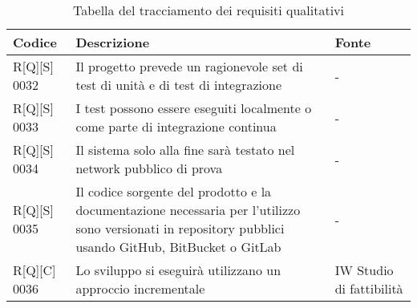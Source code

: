 \begin{center}
    \begin{longtable}{|p{2cm}|p{9cm}|p{2cm}|}%
    \caption{Tabella del tracciamento dei requisiti qualitativi}
    \label{tab:requisiti-qualitativi}
    \endfirsthead
    \endhead
    \hline
    \textbf{Codice} & \textbf{Descrizione} & \textbf{Fonte}\\
    \hline
    R[Q][S] 0032    & Il progetto prevede un ragionevole set di test di unità e di test di integrazione & - \\
    \hline
    R[Q][S] 0033   & I test possono essere eseguiti localmente o come parte di integrazione continua & - \\
    \hline
    R[Q][S] 0034    & Il sistema solo alla fine sarà testato nel network pubblico di prova & - \\
    \hline
    R[Q][S] 0035    & Il codice sorgente del prodotto e la documentazione necessaria per l’utilizzo sono versionati in repository pubblici usando GitHub, BitBucket o GitLab & - \\
    \hline
    R[Q][C] 0036    & Lo sviluppo si eseguirà utilizzano un approccio incrementale  & IW Studio di fattibilità \\
    \hline
    \end{longtable}
    \end{center}%

